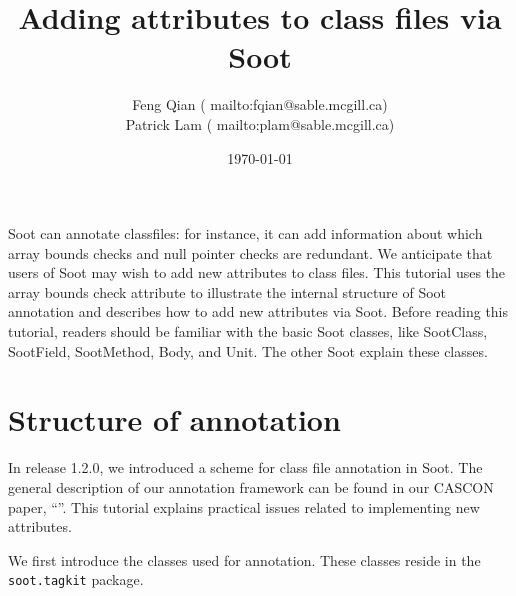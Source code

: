 \documentclass{article}
\begin{document}
\title{Adding attributes to class files via Soot}
\author{Feng Qian (
        {mailto:fqian@sable.mcgill.ca})\\
        Patrick Lam ( 
        {mailto:plam@sable.mcgill.ca})}
\date{\today}
\maketitle

Soot can annotate classfiles: for instance, it can add information
about which array bounds checks and null pointer checks are redundant.
We anticipate that users of Soot may wish to add new attributes to
class files.  This tutorial uses the array bounds check attribute to
illustrate the internal structure of Soot annotation and describes how
to add new attributes via Soot. Before reading this tutorial, readers
should be familiar with the basic Soot classes, like SootClass,
SootField, SootMethod, Body, and Unit. The other Soot
explain these classes.

\section{Structure of annotation}
In release 1.2.0, we introduced a scheme for class file annotation in
Soot.  The general description of our annotation framework can be
found in our CASCON paper, ``''.
This tutorial explains practical issues related to implementing new
attributes.

We first introduce the classes used for annotation.  These classes
reside in the {\tt soot.tagkit} package.
\end{document}
